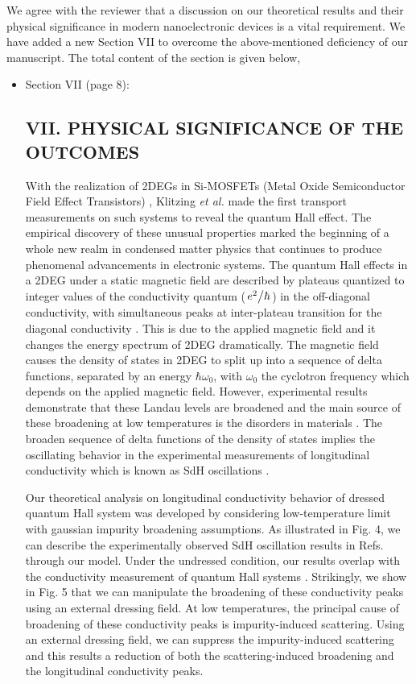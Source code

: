 \documentclass{article}
\begin{document}
We agree with the reviewer that a discussion on our theoretical results and their physical significance in modern nanoelectronic devices is a vital requirement. We have added a new Section VII to overcome the above-mentioned deficiency of our manuscript. The total content of the section is given below,

\begin{itemize}
  \item Section VII (page 8):\\
  {\color{Red}
  \subsection*{VII. PHYSICAL SIGNIFICANCE OF THE OUTCOMES}

  With the realization of 2DEGs in Si-MOSFETs (Metal Oxide Semiconductor Field Effect Transistors) \citep{fowler66}, Klitzing \textit{et al.} \cite{klitzing80} made the first transport measurements on such systems to reveal the quantum Hall effect. The empirical discovery of these unusual properties marked the beginning of a whole new realm in condensed matter physics that continues to produce phenomenal advancements in electronic systems. The quantum Hall effects in a 2DEG under a static magnetic field are described by plateaus quantized to integer values of the conductivity quantum ($\flatfrac{e^2}{\hbar}$) in the off-diagonal conductivity, with simultaneous peaks at inter-plateau transition for the diagonal conductivity \cite{endo09}. This is due to the applied magnetic field and it changes the energy spectrum of 2DEG dramatically. The magnetic field causes the density of states in 2DEG to split up into a sequence of delta functions, separated by an energy $\hbar\omega_0$, with $\omega_0$ the cyclotron frequency which depends on the applied magnetic field.
  However, experimental results demonstrate that these Landau levels are broadened and the main source of these broadening at low temperatures is the disorders in materials \cite{ando85,dial07}. The broaden sequence of delta functions of the density of states implies the oscillating behavior in the experimental measurements of longitudinal conductivity which is known as SdH oscillations \cite{endo09,wakabayashi78}.

  Our theoretical analysis on longitudinal conductivity behavior of dressed quantum Hall system was developed by considering low-temperature limit with gaussian impurity broadening assumptions.
  As illustrated in Fig. 4, we can describe the experimentally observed SdH oscillation results in Refs.\cite{endo09,wakabayashi78} through our model.
  Under the undressed condition, our results overlap with the conductivity measurement of quantum Hall systems \cite{endo09}. Strikingly, we show in Fig. 5 that we can manipulate the broadening of these conductivity peaks using an external dressing field. At low temperatures, the principal cause of broadening of these conductivity peaks is impurity-induced scattering. Using an external dressing field, we can suppress the impurity-induced scattering and this results a reduction of both the scattering-induced broadening and the longitudinal conductivity peaks.

}
\end{itemize}
\end{document}
